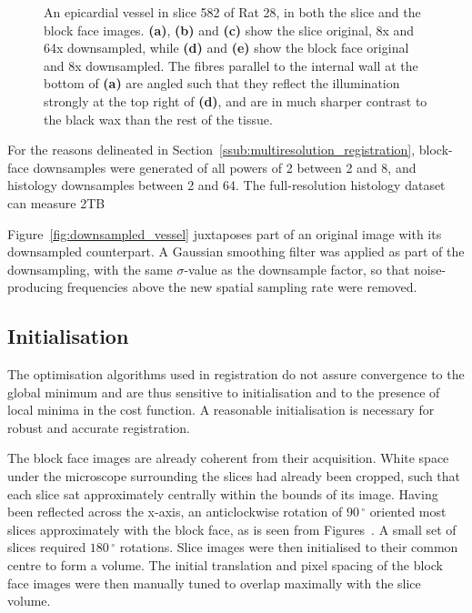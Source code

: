 \begin{figure}
      \caption{An epicardial vessel in slice 582 of Rat 28, in both the slice and the block face images. \textbf{(a)}, \textbf{(b)} and \textbf{(c)} show the slice original, 8x and 64x downsampled, while \textbf{(d)} and \textbf{(e)} show the block face original and 8x downsampled. The fibres parallel to the internal wall at the bottom of \textbf{(a)} are angled such that they reflect the illumination strongly at the top right of \textbf{(d)}, and are in much sharper contrast to the black wax than the rest of the tissue.}
      \label{fig:downsample_zooms}
    \end{figure}
    
    For the reasons delineated in Section~\ref{ssub:multiresolution_registration},  block-face downsamples were generated of all powers of 2 between 2 and 8, and histology downsamples between 2 and 64.
    The full-resolution histology dataset can measure 2TB
    
     Figure~\ref{fig:downsampled_vessel} juxtaposes part of an original image with its downsampled counterpart. A Gaussian smoothing filter was applied as part of the downsampling, with the same $\sigma$-value as the downsample factor, so that noise-producing frequencies above the new spatial sampling rate were removed.
    
  
  \subsection{Initialisation} %
  \label{sub:initialisation}
    The optimisation algorithms used in registration do not assure convergence to the global minimum and are thus sensitive to initialisation and to the presence of local minima in the cost function. A reasonable initialisation is necessary for robust and accurate registration.
	
	The block face images are already coherent from their acquisition. White space under the microscope surrounding the slices had already been cropped, such that each slice sat approximately centrally within the bounds of its image. Having been reflected across the x-axis, an anticlockwise rotation of $90\,^{\circ}$ oriented most slices approximately with the block face, as is seen from Figures~. A small set of slices required $180\,^{\circ}$ rotations. Slice images were then initialised to their common centre to form a volume. The initial translation and pixel spacing of the block face images were then manually tuned to overlap maximally with the slice volume.
    
